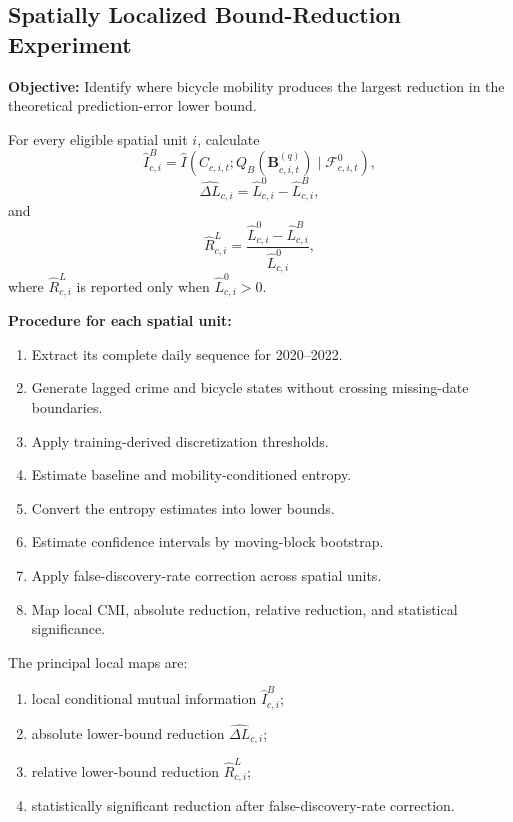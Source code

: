 \documentclass[applsci,article,submit,moreauthors]{Definitions/mdpi}
\begin{document}
\subsection{Spatially Localized Bound-Reduction Experiment}
\label{subsec:local_experiment}

\textbf{Objective:} Identify where bicycle mobility produces the largest reduction in the theoretical prediction-error lower bound.

For every eligible spatial unit $i$, calculate
\begin{equation}
\widehat{I}^{B}_{c,i}
=
\widehat{I}\!\left(
C_{c,i,t};
Q_B(\mathbf{B}^{(q)}_{c,i,t})
\mid\mathcal{F}^{0}_{c,i,t}
\right),
\end{equation}
\begin{equation}
\widehat{\Delta L}_{c,i}
=
\widehat{L}^{0}_{c,i}-\widehat{L}^{B}_{c,i},
\end{equation}
and
\begin{equation}
\widehat{R}^{L}_{c,i}
=
\frac{\widehat{L}^{0}_{c,i}-\widehat{L}^{B}_{c,i}}
{\widehat{L}^{0}_{c,i}},
\end{equation}
where \(\widehat{R}^{L}_{c,i}\) is reported only when
\(\widehat{L}^{0}_{c,i}>0\).

\textbf{Procedure for each spatial unit:}
\begin{enumerate}
    \item Extract its complete daily sequence for 2020--2022.
    \item Generate lagged crime and bicycle states without crossing missing-date boundaries.
    \item Apply training-derived discretization thresholds.
    \item Estimate baseline and mobility-conditioned entropy.
    \item Convert the entropy estimates into lower bounds.
    \item Estimate confidence intervals by moving-block bootstrap.
    \item Apply false-discovery-rate correction across spatial units.
    \item Map local CMI, absolute reduction, relative reduction, and statistical significance.
\end{enumerate}

The principal local maps are:
\begin{enumerate}
    \item local conditional mutual information $\widehat{I}^{B}_{c,i}$;
    \item absolute lower-bound reduction $\widehat{\Delta L}_{c,i}$;
    \item relative lower-bound reduction $\widehat{R}^{L}_{c,i}$;
    \item statistically significant reduction after false-discovery-rate correction.
\end{enumerate}
\end{document}
